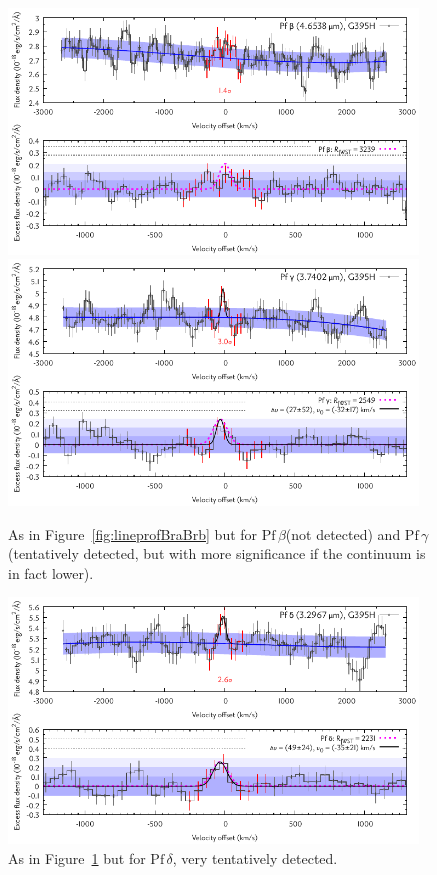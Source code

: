 \documentclass[twocolumn,twocolumnappendix]{aastex631}
\def\Pfb{\ensuremath{\mathrm{Pf}\,\beta}\xspace}            %
\def\Pfg{\ensuremath{\mathrm{Pf}\,\gamma}\xspace}           %
\def\Pfd{\ensuremath{\mathrm{Pf}\,\delta}\xspace}           %
\begin{document}
\begin{figure}
 \centering
 \includegraphics[width=0.97\textwidth]{TWA27b_g395h-f290lp_rood_sigkorr_Pfb_Dv2700_ohni300_Abb_simul.pdf}
 \includegraphics[width=0.97\textwidth]{TWA27b_g395h-f290lp_blauw_sigkorr_Pfg_Dv2700_ohni300_Abb_simul.pdf}
\caption{%
As in Figure~\ref{fig:lineprofBraBrb} but for \Pfb (not detected) and \Pfg (tentatively detected, but with more significance if the continuum is in fact lower).
}
\label{fig:lineprofPfbPfg}
\end{figure}


\begin{figure}
 \centering
 \includegraphics[width=0.97\textwidth]{TWA27b_g395h-f290lp_blauw_sigkorr_Pfd_Dv2700_ohni300_Abb_simul.pdf}
\caption{%
As in Figure~\ref{fig:lineprofPfbPfg} but for \Pfd, very tentatively detected.
}
\label{fig:lineprofPfd}
\end{figure}
\end{document}
